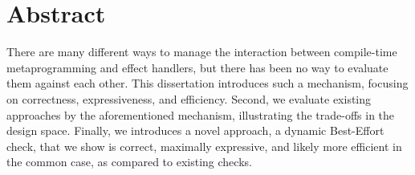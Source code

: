 \chapter*{Abstract}
There are many different ways to manage the interaction between compile-time metaprogramming and effect handlers, but there has been no way to evaluate them against each other. This dissertation introduces such a mechanism, focusing on correctness, expressiveness, and efficiency. Second, we evaluate existing approaches by the aforementioned mechanism, illustrating the trade-offs in the design space. Finally, we introduces a novel approach, a dynamic Best-Effort check, that we show is correct, maximally expressive, and likely more efficient in the common case, as compared to existing checks. 